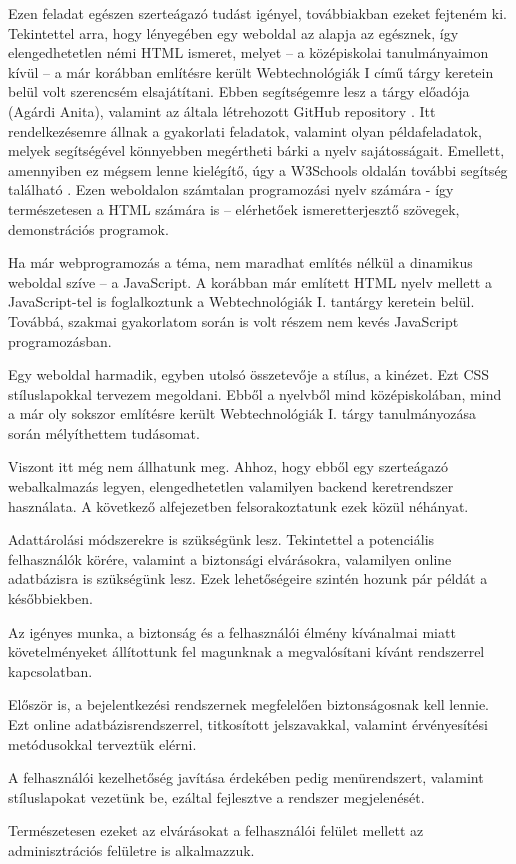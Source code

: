 Ezen feladat egészen szerteágazó tudást igényel, továbbiakban ezeket fejteném ki. Tekintettel arra, hogy lényegében egy weboldal az alapja az egésznek, így elengedhetetlen némi HTML ismeret, melyet – a középiskolai tanulmányaimon kívül – a már korábban említésre került Webtechnológiák I című tárgy keretein belül volt szerencsém elsajátítani. Ebben segítségemre lesz a tárgy előadója (Agárdi Anita), valamint az általa létrehozott GitHub repository \cite{webtechgithub}. Itt rendelkezésemre állnak a gyakorlati feladatok, valamint olyan példafeladatok, melyek segítségével könnyebben megértheti bárki a nyelv sajátosságait. Emellett, amennyiben ez mégsem lenne kielégítő, úgy a W3Schools oldalán további segítség található \cite{w3schools}. Ezen weboldalon számtalan programozási nyelv számára - így természetesen a HTML számára is – elérhetőek ismeretterjesztő szövegek, demonstrációs programok.

Ha már webprogramozás a téma, nem maradhat említés nélkül a dinamikus weboldal szíve – a JavaScript. A korábban már említett HTML nyelv mellett a JavaScript-tel is foglalkoztunk a Webtechnológiák I. tantárgy keretein belül. Továbbá, szakmai gyakorlatom során is volt részem nem kevés JavaScript programozásban.

Egy weboldal harmadik, egyben utolsó összetevője a stílus, a kinézet. Ezt CSS stíluslapokkal tervezem megoldani. Ebből a nyelvből mind középiskolában, mind a már oly sokszor említésre került Webtechnológiák I. tárgy tanulmányozása során mélyíthettem tudásomat.

Viszont itt még nem állhatunk meg. Ahhoz, hogy ebből egy szerteágazó webalkalmazás legyen, elengedhetetlen valamilyen backend keretrendszer használata. A következő alfejezetben felsorakoztatunk ezek közül néhányat.

Adattárolási módszerekre is szükségünk lesz. Tekintettel a potenciális felhasználók körére, valamint a biztonsági elvárásokra, valamilyen online adatbázisra is szükségünk lesz. Ezek lehetőségeire szintén hozunk pár példát a későbbiekben.



Az igényes munka, a biztonság és a felhasználói élmény kívánalmai miatt követelményeket állítottunk fel magunknak a megvalósítani kívánt rendszerrel kapcsolatban.

Először is, a bejelentkezési rendszernek megfelelően biztonságosnak kell lennie. Ezt online adatbázisrendszerrel, titkosított jelszavakkal, valamint érvényesítési metódusokkal terveztük elérni.

A felhasználói kezelhetőség javítása érdekében pedig menürendszert, valamint stíluslapokat vezetünk be, ezáltal fejlesztve a rendszer megjelenését.

Természetesen ezeket az elvárásokat a felhasználói felület mellett az adminisztrációs felületre is alkalmazzuk.

